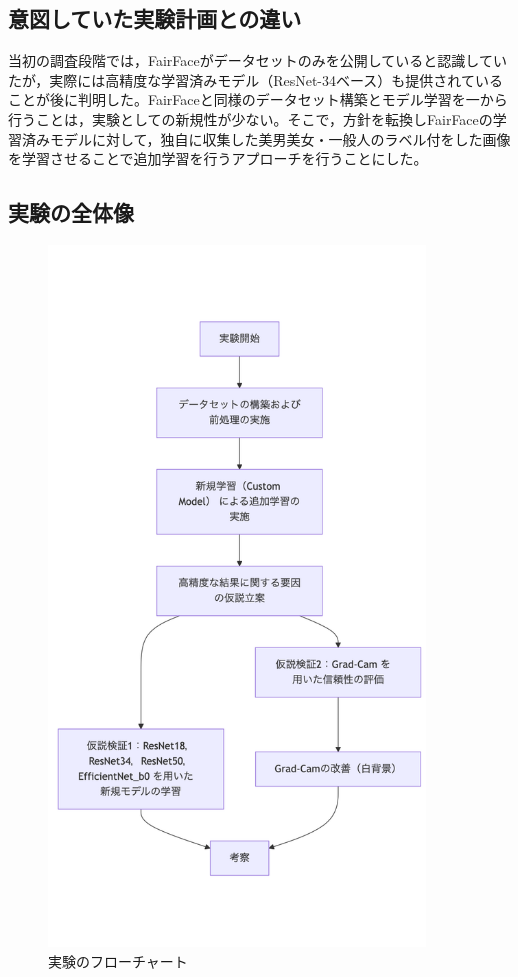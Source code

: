 \documentclass[a4paper,11pt,titlepage]{jsarticle}
\begin{document}
\subsection{意図していた実験計画との違い}
\label{label:意図していた実験計画との違い}
当初の調査段階では，FairFaceがデータセットのみを公開していると認識していたが，実際には高精度な学習済みモデル（ResNet-34ベース）も提供されていることが後に判明した。FairFaceと同様のデータセット構築とモデル学習を一から行うことは，実験としての新規性が少ない。そこで，方針を転換しFairFaceの学習済みモデルに対して，独自に収集した美男美女・一般人のラベル付をした画像を学習させることで追加学習を行うアプローチを行うことにした。

\subsection{実験の全体像}
\begin{figure}[H]
    \centering
    \includegraphics[width=100mm]{overall.png}
    \caption{実験のフローチャート}
    \label{fig:csv}
\end{figure}
\end{document}
